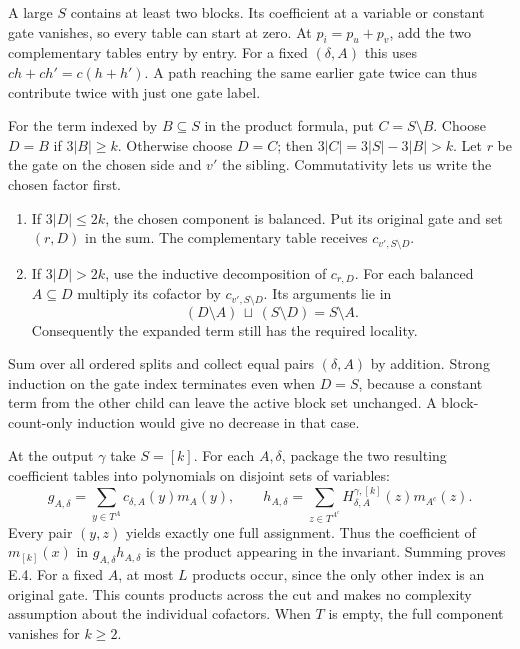 
\clearpage
{}
A large $S$ contains at least two blocks. Its coefficient at a variable or constant gate vanishes, so every table can start at zero. At $p_i=p_u+p_v$, add the two complementary tables entry by entry. For a fixed $(\delta,A)$ this uses $ch+ch'=c(h+h')$. A path reaching the same earlier gate twice can thus contribute twice with just one gate label.

For the term indexed by $B\subseteq S$ in the product formula, put $C=S\setminus B$. Choose $D=B$ if $3|B|\ge k$. Otherwise choose $D=C$; then $3|C|=3|S|-3|B|>k$. Let $r$ be the gate on the chosen side and $v'$ the sibling. Commutativity lets us write the chosen factor first.

\begin{enumerate}
\item If $3|D|\le2k$, the chosen component is balanced. Put its original gate and set $(r,D)$ in the sum. The complementary table receives $c_{v',S\setminus D}$.
\item If $3|D|>2k$, use the inductive decomposition of $c_{r,D}$. For each balanced $A\subseteq D$ multiply its cofactor by $c_{v',S\setminus D}$. Its arguments lie in
\[
 (D\setminus A)\,\sqcup\,(S\setminus D)=S\setminus A .
\]
Consequently the expanded term still has the required locality.
\end{enumerate}
Sum over all ordered splits and collect equal pairs $(\delta,A)$ by addition. Strong induction on the gate index terminates even when $D=S$, because a constant term from the other child can leave the active block set unchanged. A block-count-only induction would give no decrease in that case.

At the output $\gamma$ take $S=[k]$. For each $A,\delta$, package the two resulting coefficient tables into polynomials on disjoint sets of variables:
\[
 g_{A,\delta}=\sum_{y\in T^A}c_{\delta,A}(y)m_A(y),\qquad
 h_{A,\delta}=\sum_{z\in T^{A^c}}H^{\gamma,[k]}_{\delta,A}(z)m_{A^c}(z).
\]
Every pair $(y,z)$ yields exactly one full assignment. Thus the coefficient of $m_{[k]}(x)$ in $g_{A,\delta}h_{A,\delta}$ is the product appearing in the invariant. Summing proves E.4. For a fixed $A$, at most $L$ products occur, since the only other index is an original gate. This counts products across the cut and makes no complexity assumption about the individual cofactors. When $T$ is empty, the full component vanishes for $k\ge2$.

